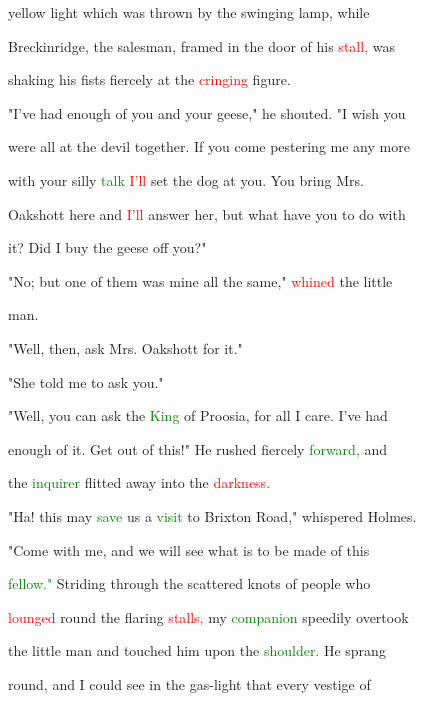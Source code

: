  yellow light which was thrown by the swinging lamp, while

 Breckinridge, the salesman, framed in the door of his \textcolor{red}{stall,} was

 shaking his fists fiercely at the \textcolor{red}{cringing} figure.



 "I've had enough of you and your geese," he \textcolor{BurntOrange}{shouted.} "I wish you

 were all at the \textcolor{BurntOrange}{devil} together. If you come pestering me any more

 with your \textcolor{BurntOrange}{silly} \textcolor{green}{talk} \textcolor{red}{I'll} set the dog at you. You bring Mrs.

 Oakshott here and \textcolor{red}{I'll} answer her, but what have you to do with

 it? Did I buy the geese off you?"



 "No; but one of them was mine all the same," \textcolor{red}{whined} the little

 man.



 "Well, then, ask Mrs. Oakshott for it."



 "She told me to ask you."



 "Well, you can ask the \textcolor{green}{King} of Proosia, for all I care. I've had

 enough of it. Get out of this!" He rushed fiercely \textcolor{green}{forward,} and

 the \textcolor{green}{inquirer} flitted away into the \textcolor{red}{darkness.}



 "Ha! this may \textcolor{green}{save} us a \textcolor{green}{visit} to Brixton Road," whispered Holmes.

 "Come with me, and we will see what is to be made of this

 \textcolor{green}{fellow."} Striding through the scattered knots of people who

 \textcolor{red}{lounged} round the flaring \textcolor{red}{stalls,} my \textcolor{green}{companion} speedily overtook

 the little man and touched him upon the \textcolor{green}{shoulder.} He sprang

 round, and I could see in the gas-light that every vestige of

